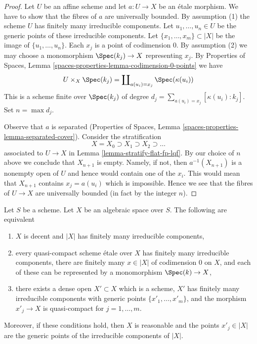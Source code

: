\begin{proof}
Let $U$ be an affine scheme and let $a : U \to X$ be an \'etale morphism.
We have to show that the fibres of $a$ are universally bounded. By
assumption (1) the scheme $U$ has finitely many irreducible components.
Let $u_1, \ldots, u_n \in U$ be the generic points of these irreducible
components. Let $\{x_1, \ldots, x_m\} \subset |X|$ be the image
of $\{u_1, \ldots, u_n\}$. Each $x_j$ is a point of codimension $0$.
By assumption (2) we may choose a monomorphism $\Spec(k_j) \to X$
representing $x_j$. By Properties of Spaces, Lemma
\ref{spaces-properties-lemma-codimension-0-points} we have
$$
U \times_X \Spec(k_j) = \coprod\nolimits_{a(u_i) = x_j} \Spec(\kappa(u_i))
$$
This is a scheme finite over $\Spec(k_j)$ of degree
$d_j = \sum_{a(u_i) = x_j} [\kappa(u_i) : k_j]$. Set $n = \max d_j$.

\medskip\noindent
Observe that $a$ is separated
(Properties of Spaces, Lemma \ref{spaces-properties-lemma-separated-cover}).
Consider the stratification
$$
X = X_0 \supset X_1 \supset X_2 \supset \ldots
$$
associated to $U \to X$ in Lemma \ref{lemma-stratify-flat-fp-lqf}.
By our choice of $n$ above we conclude that $X_{n + 1}$ is empty.
Namely, if not, then $a^{-1}(X_{n + 1})$ is a nonempty open
of $U$ and hence would contain one of the $x_i$. This would mean
that $X_{n + 1}$ contains $x_j = a(u_i)$ which is impossible.
Hence we see that the fibres of $U \to X$ are universally bounded
(in fact by the integer $n$).
\end{proof}

\begin{lemma}
\label{lemma-finitely-many-irreducible-components}
Let $S$ be a scheme. Let $X$ be an algebraic space over $S$.
The following are equivalent
\begin{enumerate}
\item $X$ is decent and $|X|$ has finitely many irreducible components,
\item every quasi-compact scheme \'etale over $X$ has finitely many
irreducible components, there are finitely many $x \in |X|$ of
codimension $0$ on $X$, and each of these can be represented
by a monomorphism $\Spec(k) \to X$,
\item there exists a dense open $X' \subset X$ which is
a scheme, $X'$ has finitely many irreducible components
with generic points $\{x'_1, \ldots, x'_m\}$, and
the morphism $x'_j \to X$ is quasi-compact for $j = 1, \ldots, m$.
\end{enumerate}
Moreover, if these conditions hold, then $X$ is reasonable and the
points $x'_j \in |X|$ are the generic points of the irreducible
components of $|X|$.
\end{lemma}

